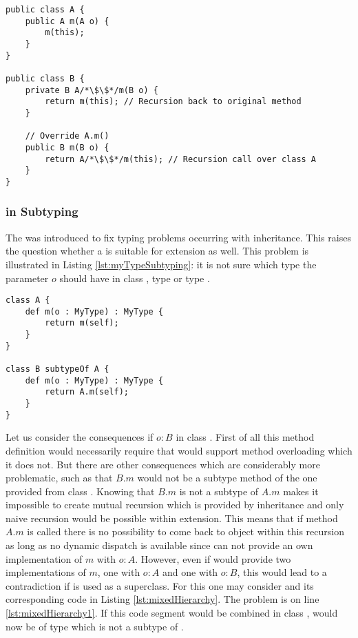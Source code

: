 \begin{lstlisting}[float=ht,caption=Subclassing with \mytype translated to Java.,label=lst:javaTransMyTypeSubclassing]
public class A {
	public A m(A o) {
		m(this);
	}
}

public class B {
	private B A/*\$\$*/m(B o) {
		return m(this); // Recursion back to original method
	}

	// Override A.m()
	public B m(B o) {
		return A/*\$\$*/m(this); // Recursion call over class A
	}
}
\end{lstlisting}

\subsubsection{\mytype in Subtyping}
\label{ssec:mytypeInSubtype}
The \mytype was introduced to fix typing problems occurring with
inheritance. This raises the question whether a \mytype is suitable
for extension as well. This problem is illustrated in Listing
\ref{lst:myTypeSubtyping}: it is not sure which type the parameter
$o$ should have in class \B, type \B or type \A.

\begin{lstlisting}[float=ht,language=ooplss,caption=\mytype within subtyping contexts.,label=lst:myTypeSubtyping]
class A {
	def m(o : MyType) : MyType {
		return m(self);
	}
}

class B subtypeOf A {
	def m(o : MyType) : MyType {
		return A.m(self);
	}
}
\end{lstlisting}

Let us consider the consequences if $o : B$ in class \B. First of all this
method definition would necessarily require that \ooplss would support
method overloading which it does not. But there are other consequences which
are considerably more problematic, such as that $B.m$ would not be a subtype method of the one
provided from class \A. Knowing that $B.m$ is not a subtype of $A.m$
makes it impossible to create mutual recursion which is provided by inheritance
and only naive recursion would be possible within extension. This means
that if method $A.m$ is called there is no possibility to come back to object \B
within this recursion as long as no dynamic dispatch is available since \B can
not provide an own implementation of $m$ with $o : A$. However, even if \B would
provide two implementations of $m$, one with $o : A$ and one with $o : B$, this
would lead to a contradiction if \B is used as a superclass. For this one may
consider  and its corresponding code in Listing
\ref{lst:mixedHierarchy}. The problem is on line \ref{lst:mixedHierarchy1}.
If this code segment would be combined in class \C, \self would now be of type
\C which is not a subtype of \A.

